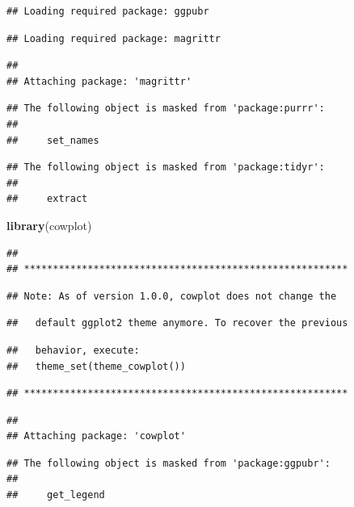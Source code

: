 \documentclass[]{article}
\newenvironment{Shaded}{\begin{snugshade}}{\end{snugshade}}
\newcommand{\KeywordTok}[1]{\textcolor[rgb]{0.13,0.29,0.53}{\textbf{#1}}}
\newcommand{\NormalTok}[1]{#1}
\begin{document}
\begin{verbatim}
## Loading required package: ggpubr
\end{verbatim}

\begin{verbatim}
## Loading required package: magrittr
\end{verbatim}

\begin{verbatim}
## 
## Attaching package: 'magrittr'
\end{verbatim}

\begin{verbatim}
## The following object is masked from 'package:purrr':
## 
##     set_names
\end{verbatim}

\begin{verbatim}
## The following object is masked from 'package:tidyr':
## 
##     extract
\end{verbatim}

\begin{Shaded}
\begin{Highlighting}[]
\KeywordTok{library}\NormalTok{(cowplot)}
\end{Highlighting}
\end{Shaded}

\begin{verbatim}
## 
## ********************************************************
\end{verbatim}

\begin{verbatim}
## Note: As of version 1.0.0, cowplot does not change the
\end{verbatim}

\begin{verbatim}
##   default ggplot2 theme anymore. To recover the previous
\end{verbatim}

\begin{verbatim}
##   behavior, execute:
##   theme_set(theme_cowplot())
\end{verbatim}

\begin{verbatim}
## ********************************************************
\end{verbatim}

\begin{verbatim}
## 
## Attaching package: 'cowplot'
\end{verbatim}

\begin{verbatim}
## The following object is masked from 'package:ggpubr':
## 
##     get_legend
\end{verbatim}
\end{document}
